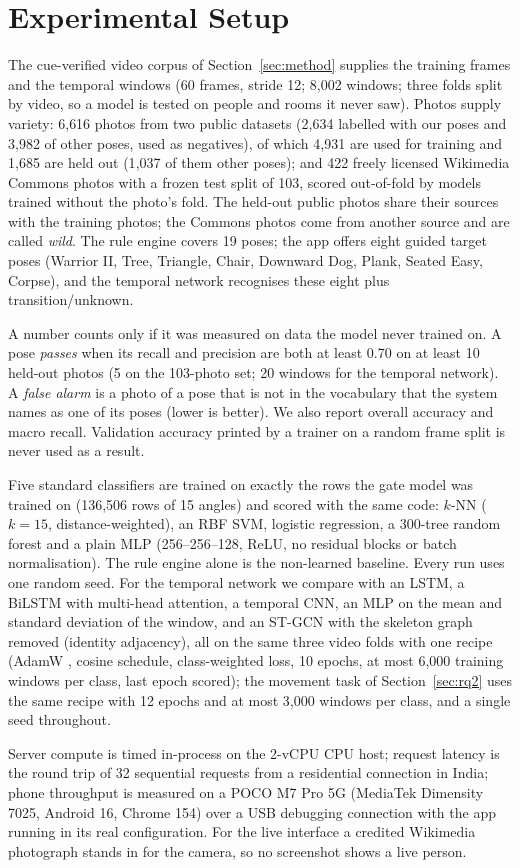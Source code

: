 \section{Experimental Setup}\label{sec:setup}
 The cue-verified video corpus of Section~\ref{sec:method} supplies the training frames and the temporal windows (60 frames, stride 12; 8{,}002 windows; three folds split by video, so a model is tested on people and rooms it never saw). Photos supply variety: 6{,}616 photos from two public datasets (2{,}634 labelled with our poses and 3{,}982 of other poses, used as negatives), of which 4{,}931 are used for training and 1{,}685 are held out (1{,}037 of them other poses); and 422 freely licensed Wikimedia Commons photos with a frozen test split of 103, scored out-of-fold by models trained without the photo's fold. The held-out public photos share their sources with the training photos; the Commons photos come from another source and are called \emph{wild}. The rule engine covers 19 poses; the app offers eight guided target poses (Warrior II, Tree, Triangle, Chair, Downward Dog, Plank, Seated Easy, Corpse), and the temporal network recognises these eight plus transition/unknown.

 A number counts only if it was measured on data the model never trained on. A pose \emph{passes} when its recall and precision are both at least 0.70 on at least 10 held-out photos (5 on the 103-photo set; 20 windows for the temporal network). A \emph{false alarm} is a photo of a pose that is not in the vocabulary that the system names as one of its poses (lower is better). We also report overall accuracy and macro recall. Validation accuracy printed by a trainer on a random frame split is never used as a result.

 Five standard classifiers are trained on exactly the rows the gate model was trained on (136{,}506 rows of 15 angles) and scored with the same code: $k$-NN ($k{=}15$, distance-weighted), an RBF SVM, logistic regression, a 300-tree random forest and a plain MLP (256--256--128, ReLU, no residual blocks or batch normalisation). The rule engine alone is the non-learned baseline. Every run uses one random seed. For the temporal network we compare with an LSTM, a BiLSTM with multi-head attention, a temporal CNN, an MLP on the mean and standard deviation of the window, and an ST-GCN with the skeleton graph removed (identity adjacency), all on the same three video folds with one recipe (AdamW \cite{loshchilov2019adamw}, cosine schedule, class-weighted loss, 10 epochs, at most 6{,}000 training windows per class, last epoch scored); the movement task of Section~\ref{sec:rq2} uses the same recipe with 12 epochs and at most 3{,}000 windows per class, and a single seed throughout.

 Server compute is timed in-process on the 2-vCPU CPU host; request latency is the round trip of 32 sequential requests from a residential connection in India; phone throughput is measured on a POCO M7 Pro 5G (MediaTek Dimensity 7025, Android 16, Chrome 154) over a USB debugging connection with the app running in its real configuration. For the live interface a credited Wikimedia photograph stands in for the camera, so no screenshot shows a live person.
